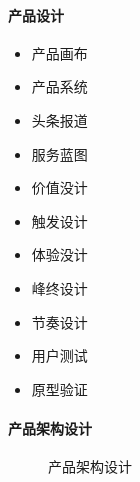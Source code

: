 \documentclass[letterpaper,11pt,english]{sphinxmanual}
\begin{document}
\paragraph{产品设计}
\label{\detokenize{chapter_idea/design:id10}}\begin{itemize}
\item {} 
产品画布

\item {} 
产品系统

\item {} 
头条报道

\item {} 
服务蓝图

\item {} 
价值没计

\item {} 
触发设计

\item {} 
体验没计

\item {} 
峰终设计

\item {} 
节奏设计

\item {} 
用户测试

\item {} 
原型验证

\end{itemize}


\paragraph{产品架构设计}
\label{\detokenize{chapter_idea/design:id11}}
\begin{figure}[H]
\centering
\capstart

\noindent{}
\caption{产品架构设计\sphinxfootnotemark[389]}\label{\detokenize{chapter_idea/design:id13}}\end{figure}
%
\begin{footnotetext}[389]\sphinxAtStartFootnote
{}
%
\end{footnotetext}\ignorespaces 
\end{document}

